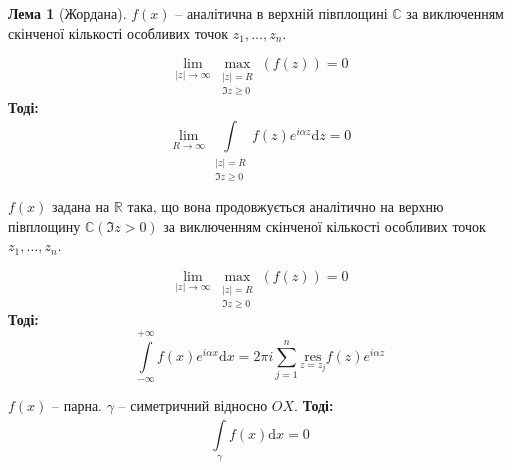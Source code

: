\documentclass[a4paper]{scrartcl}
\theoremstyle{definition}
\newtheorem*{lemme}{Лема}
\theoremstyle{remark}
\theoremstyle{definition}
\theoremstyle{definition}
\def\i{\infty}                 %
\def\res#1{\underset{#1}{\mathrm{res}}}
\begin{document}
\begin{lemme}[Жордана]
  $f(x)$  -- аналітична в верхній півплощині $\mathbb{C}$ за виключенням
  скінченої кількості особливих точок $z_1 , \dots , z_n$.\par
  $$
   \lim\limits_{|z|\to  \infty}{
   \max_{\substack{|z| = R \\
   \Im z \geq  0}} \left( f(z) \right)
   } = 0
  $$
  \textbf{Тоді:}
  $$
   \lim\limits_{R\to  \infty}{
    \int\limits_{\substack{|z| = R \\
    \Im z \geq  0}}^{}{
f(z) e^{i \alpha z} \mathrm{d} z
    }
   } = 0
  $$
\end{lemme}
\begin{boxteo}
$f(x)$ задана на $\mathbb{R}$ така, що вона продовжується аналітично на верхню півплощину $\mathbb{C} (\Im z > 0)$ за виключенням
скінченої кількості особливих точок $z_1 , \dots , z_n$.\par
$$
 \lim\limits_{|z|\to  \infty}{
 \max_{\substack{|z| = R \\
 \Im z \geq  0}} \left( f(z) \right)
 } = 0
$$
\textbf{Тоді:}
$$
 \int\limits_{-\i}^{ +\infty}{
f(x) e^{i \alpha x} \mathrm{d} x
 } = 2 \pi i  \sum\limits_{j = 1}^{ n}{ \res{z = z_j }f(z) e^{i \alpha z}}
$$
\end{boxteo}
\begin{boxteo}
$f(x)$ -- парна. $\gamma$ -- симетричний відносно $OX$.
\textbf{Тоді:}
$$
 \int\limits_{\gamma}^{}{ f(x) \mathrm{d} x} = 0
$$
\end{boxteo}
\end{document}
